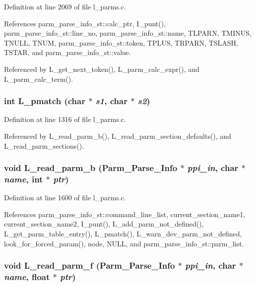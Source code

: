 Definition at line 2069 of file l\_\-parms.c.

References parm\_\-parse\_\-info\_\-st::calc\_\-ptr, I\_\-punt(), parm\_\-parse\_\-info\_\-st::line\_\-no, parm\_\-parse\_\-info\_\-st::name, TLPARN, TMINUS, TNULL, TNUM, parm\_\-parse\_\-info\_\-st::token, TPLUS, TRPARN, TSLASH, TSTAR, and parm\_\-parse\_\-info\_\-st::value.

Referenced by L\_\-get\_\-next\_\-token(), L\_\-parm\_\-calc\_\-expr(), and L\_\-parm\_\-calc\_\-term().
\subsubsection{\setlength{\rightskip}{0pt plus 5cm}int L\_\-pmatch (char $\ast$ {\em s1}, char $\ast$ {\em s2})}\label{l__parms_8c_4765bf6935180114326aeea11d1c65ae}




Definition at line 1316 of file l\_\-parms.c.

Referenced by L\_\-read\_\-parm\_\-b(), L\_\-read\_\-parm\_\-section\_\-defaults(), and L\_\-read\_\-parm\_\-sections().
\subsubsection{\setlength{\rightskip}{0pt plus 5cm}void L\_\-read\_\-parm\_\-b (\bf{Parm\_\-Parse\_\-Info} $\ast$ {\em ppi\_\-in}, char $\ast$ {\em name}, int $\ast$ {\em ptr})}\label{l__parms_8c_5f83d604b2e536e100ebc2576bed22d3}




Definition at line 1600 of file l\_\-parms.c.

References parm\_\-parse\_\-info\_\-st::command\_\-line\_\-list, current\_\-section\_\-name1, current\_\-section\_\-name2, I\_\-punt(), L\_\-add\_\-parm\_\-not\_\-defined(), L\_\-get\_\-parm\_\-table\_\-entry(), L\_\-pmatch(), L\_\-warn\_\-dev\_\-parm\_\-not\_\-defined, look\_\-for\_\-forced\_\-param(), node, NULL, and parm\_\-parse\_\-info\_\-st::parm\_\-list.
\subsubsection{\setlength{\rightskip}{0pt plus 5cm}void L\_\-read\_\-parm\_\-f (\bf{Parm\_\-Parse\_\-Info} $\ast$ {\em ppi\_\-in}, char $\ast$ {\em name}, float $\ast$ {\em ptr})}\label{l__parms_8c_69d2c69fef1a9100a445b1bac6dbce60}




